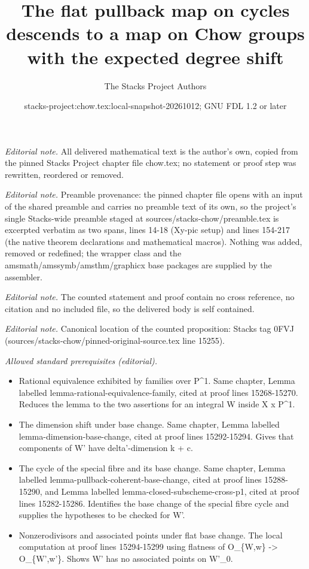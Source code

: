 \documentclass[10pt,a4paper]{amsart}
\title{The flat pullback map on cycles descends to a map on Chow groups with the expected degree shift}
\author{The Stacks Project Authors}
\date{stacks-project:chow.tex:local-snapshot-20261012; GNU FDL 1.2 or later}
\theoremstyle{plain}
\theoremstyle{definition}
\theoremstyle{remark}
\numberwithin{equation}{subsection}
\begin{document}
\maketitle
\noindent\textit{Editorial note.} All delivered mathematical text is the author's own, copied from the pinned Stacks Project chapter file chow.tex; no statement or proof step was rewritten, reordered or removed.\par\medskip
\noindent\textit{Editorial note.} Preamble provenance: the pinned chapter file opens with an input of the shared preamble and carries no preamble text of its own, so the project's single Stacks-wide preamble staged at sources/stacks-chow/preamble.tex is excerpted verbatim as two spans, lines 14-18 (Xy-pic setup) and lines 154-217 (the native theorem declarations and mathematical macros). Nothing was added, removed or redefined; the wrapper class and the amsmath/amssymb/amsthm/graphicx base packages are supplied by the assembler.\par\medskip
\noindent\textit{Editorial note.} The counted statement and proof contain no cross reference, no citation and no included file, so the delivered body is self contained.\par\medskip
\noindent\textit{Editorial note.} Canonical location of the counted proposition: Stacks tag 0FVJ (sources/stacks-chow/pinned-original-source.tex line 15255).\par\medskip
\noindent\textit{Allowed standard prerequisites (editorial).}\begin{itemize}
\item Rational equivalence exhibited by families over P\textasciicircum{}1. Same chapter, Lemma labelled lemma-rational-equivalence-family, cited at proof lines 15268-15270. Reduces the lemma to the two assertions for an integral W inside X x P\textasciicircum{}1.
\item The dimension shift under base change. Same chapter, Lemma labelled lemma-dimension-base-change, cited at proof lines 15292-15294. Gives that components of W' have delta'-dimension k + c.
\item The cycle of the special fibre and its base change. Same chapter, Lemma labelled lemma-pullback-coherent-base-change, cited at proof lines 15288-15290, and Lemma labelled lemma-closed-subscheme-cross-p1, cited at proof lines 15282-15286. Identifies the base change of the special fibre cycle and supplies the hypotheses to be checked for W'.
\item Nonzerodivisors and associated points under flat base change. The local computation at proof lines 15294-15299 using flatness of O\_\{W,w\} -> O\_\{W',w'\}. Shows W' has no associated points on W'\_0.
\end{itemize}\medskip
\end{document}
